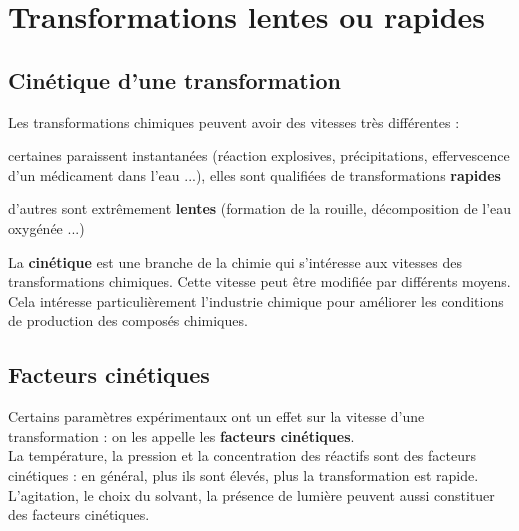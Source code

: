 \documentclass[a4paper,13pt,fleqn]{scrartcl}%
\begin{document}
\maketitle

\section{Transformations lentes ou rapides}
    \subsection{Cinétique d'une transformation}
    Les transformations chimiques peuvent avoir des vitesses très différentes :
    \begin{itemize*}
        \item certaines paraissent instantanées (réaction explosives, précipitations, effervescence d'un médicament dans l'eau ...), elles sont qualifiées de transformations \textbf{rapides}
        \item d'autres sont extrêmement \textbf{lentes} (formation de la rouille, décomposition de l'eau oxygénée ...)
    \end{itemize*}
    La \textbf{cinétique} est une branche de la chimie qui s'intéresse aux vitesses des transformations chimiques. Cette vitesse peut être modifiée par différents moyens. Cela intéresse particulièrement l'industrie chimique pour améliorer les conditions de production des composés chimiques.

    \subsection{Facteurs cinétiques}
    Certains paramètres expérimentaux ont un effet sur la vitesse d'une transformation : on les appelle les \textbf{facteurs cinétiques}.\\
    La température, la pression et la concentration des réactifs sont des facteurs cinétiques : en général, plus ils sont élevés, plus la transformation est rapide. L'agitation, le choix du solvant, la présence de lumière peuvent aussi constituer des facteurs cinétiques.
\end{document}
